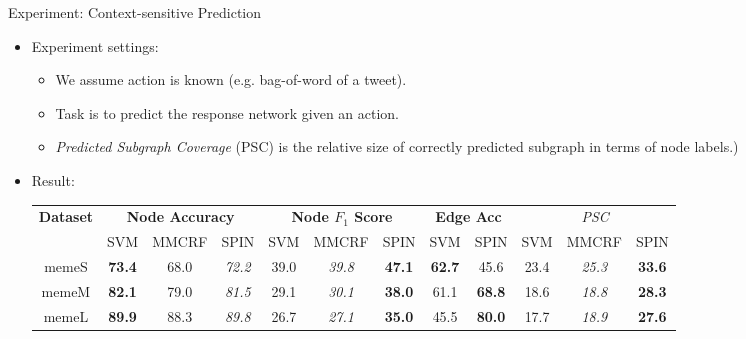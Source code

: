 \documentclass[first=dgreen,second=purple,logo=yellowexc]{aaltoslides}
\begin{document}
\begin{frame}{Experiment: Context-sensitive Prediction}
	\begin{itemize}
		\item Experiment settings:
			\begin{itemize}
				\item We assume action is known (e.g. bag-of-word of a tweet).
				\item Task is to predict the response network given an action.
				\item {\em Predicted Subgraph Coverage} (PSC) is the relative size of correctly predicted subgraph in terms of node labels.)
			\end{itemize}
		\item Result:
		\begin{table}[t]
		\scriptsize
		\centering
		\begin{tabular}{|@{ }c@{ }|@{}c@{ }c@{ }c@{}|@{}c@{ }c@{ }c@{}|@{}c@{ }c@{}|@{}c@{ }c@{ }c@{}|}
		  \hline
		\multirow{2}{*}{\textbf{Dataset}} & \multicolumn{3}{c}{\textbf{Node Accuracy}} & \multicolumn{3}{|c}{\textbf{Node $F_1$ Score}} & \multicolumn{2}{|c}{\textbf{Edge Acc}} & \multicolumn{3}{|c|}{{\em PSC}}  \\ \cline{2-12}
		 & \scriptsize{SVM} & \scriptsize{MMCRF} & \scriptsize{SPIN} & \scriptsize{SVM} & \scriptsize{MMCRF} & \scriptsize{SPIN} & \scriptsize{SVM}  & \scriptsize{SPIN}  & \scriptsize{SVM} & \scriptsize{MMCRF} & \scriptsize{SPIN}  \\ \hline
		   memeS  & \textbf{73.4} & {68.0} & \em{72.2} & {39.0} & \em{39.8} & \textbf{47.1} & \textbf{62.7} & {45.6} & {23.4} & \em{25.3} & \textbf{33.6} \\ 
		   memeM  & \textbf{82.1} & {79.0} & \em{81.5} & {29.1} & \em{30.1} & \textbf{38.0} & {61.1} & \textbf{68.8} & {18.6} & \em{18.8} & \textbf{28.3} \\ 
		   memeL  & \textbf{89.9} & {88.3} & \em{89.8} & {26.7} & \em{27.1} & \textbf{35.0} & {45.5} & \textbf{80.0} & {17.7} & \em{18.9} & \textbf{27.6} \\ 

\end{tabular}
\end{table}
\end{itemize}
\end{frame}
\end{document}
